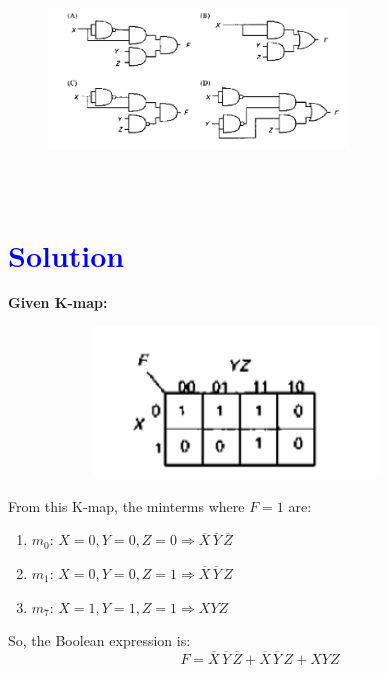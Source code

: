 \documentclass[a4paper,12pt]{article}
\begin{document}
\vspace{1em}
\begin{figure}[!h]
 \centering
     \includegraphics[width=8cm,height=6cm]{img2.png}
     \caption{}

 \end{figure}
 \section*{\textcolor{blue}{Solution}}
 
\textbf{Given K-map:}

\begin{figure}[!h]
\centering
  \includegraphics[width=10cm,height=4cm]{img1.png}
 \caption{}
\end{figure}
\vspace{0.5em}

From this K-map, the minterms where \( F = 1 \) are:

\begin{enumerate}
    \item \( m_0 \): \( X = 0, Y = 0, Z = 0 \Rightarrow \overline{X} \, \overline{Y} \, \overline{Z} \)
    \item \( m_1 \): \( X = 0, Y = 0, Z = 1 \Rightarrow \overline{X} \, \overline{Y} \, Z \)
    \item \( m_7 \): \( X = 1, Y = 1, Z = 1 \Rightarrow X Y Z \)
\end{enumerate}

So, the Boolean expression is:
\[
F = \overline{X} \, \overline{Y} \, \overline{Z} + \overline{X} \, \overline{Y} \, Z + X Y Z
\]
\end{document}
